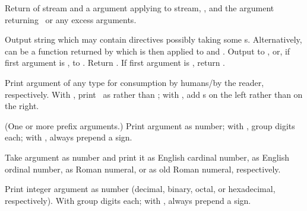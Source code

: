 \begin{LIST}{1cm}

  {
  Return  of stream and a  argument applying  to
  stream, , and the  argument
  returning \NIL\ or any excess arguments. 
  }

  {
  Output string  which may
  contain \kwd{\TLD} directives possibly taking some
  s. Alternatively,  can be a function returned
  by  which is then applied to  and .
  Output to ,  or, if first
  argument is \T, to . Return \retval{\NIL}. If
  first argument is \NIL, return . 
  }

  \begin{LIST}{.5cm}

    {
    Print argument of any type for consumption by humans/by the
    reader, respectively. With \kwd{:}, print \NIL\ as \LIT{()} rather
    than ; with , add s on the left
    rather than on the right.
  }

    {
    (One or more prefix arguments.) Print argument as number; with
    \KWD{:}, group digits  each; with ,
    always prepend a sign. 
  }

    {
    Take argument as number and print it as English cardinal number,
    as English ordinal number, as Roman numeral, or as old Roman
    numeral, respectively.
  }

    {
    Print integer argument as number (decimal, binary, octal, or
    hexadecimal, respectively). With \kwd{:} group digits 
     each; with , always prepend a sign.
  }


\end{LIST}
\end{LIST}
